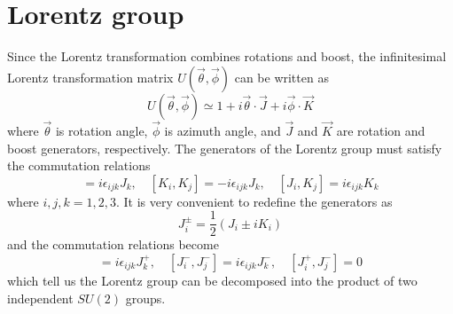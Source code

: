 \documentclass[12pt]{report}
\begin{document}
\section{Lorentz group}
Since the Lorentz transformation combines rotations and boost, the infinitesimal Lorentz transformation matrix $U(\vec{\theta}, \vec{\phi}) $ can be written as
\begin{equation}
U(\vec{\theta}, \vec{\phi}) \simeq 1  + i \vec{\theta} \cdot \vec{J} + i \vec{\phi} \cdot \vec{K}
\end{equation}
where $\vec{\theta}$ is rotation angle, $\vec{\phi}$ is azimuth angle, and $\vec{J}$ and $\vec{K}$ are rotation and boost generators, respectively.
The generators of the Lorentz group must satisfy the commutation relations
\begin{equation}
[J_{i}, J_{j}] = i \epsilon_{ijk} J_{k}, \quad
 [K_{i}, K_{j}] = -i \epsilon_{ijk} J_{k}, \quad 
 [J_{i}, K_{j}] = i \epsilon_{ijk} K_{k}
\end{equation}
where $i, j, k = 1, 2, 3$.
It is very convenient to redefine the generators as
\begin{equation}
J^{\pm}_{i} = \frac{1}{2} (J_{i} \pm i K_{i})
\end{equation}
and the commutation relations become
\begin{equation}
[J^{+}_{i}, J^{+}_{j}] = i \epsilon_{ijk} J^{+}_{k}, \quad 
[J^{-}_{i}, J^{-}_{j}] = i \epsilon_{ijk} J^{-}_{k}, \quad 
[J^{+}_{i}, J^{-}_{j}] = 0
\end{equation}
which tell us the Lorentz group can be decomposed into the product of two independent $SU(2)$ groups.
\end{document}
